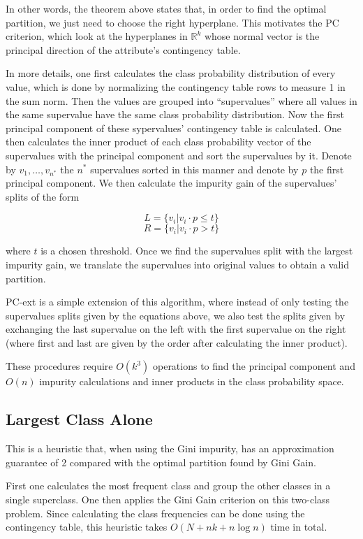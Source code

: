 In other words, the theorem above states that, in order to find the optimal partition, we just need to choose the right hyperplane. This motivates the PC criterion, which look at the hyperplanes in $\mathbb{R}^k$ whose normal vector is the principal direction of the attribute's contingency table.

In more details, one first calculates the class probability distribution of every value, which is done by normalizing the contingency table rows to measure 1 in the sum norm. Then the values are grouped into ``supervalues'' where all values in the same supervalue have the same class probability distribution. Now the first principal component of these sypervalues' contingency table is calculated. One then calculates the inner product of each class probability vector of the supervalues  with the principal component and sort the supervalues by it. Denote by $v_1,\ldots,v_{n^*}$ the $n^*$ supervalues sorted in this manner and denote by $p$ the first principal component. We then calculate the impurity gain of the supervalues' splits of the form

$$L = \{v_i | v_i \cdot p \leq t\}$$
$$R = \{v_i | v_i \cdot p > t\}$$

where $t$ is a chosen threshold. Once we find the supervalues split with the largest impurity gain, we translate the supervalues into original values to obtain a valid partition.

PC-ext is a simple extension of this algorithm, where instead of only testing the supervalues splits given by the equations above, we also test the splits given by  exchanging the last supervalue on the left with the first supervalue on the right (where first and last are given by the order after calculating the inner product).

These procedures require $O(k^3)$ operations to find the principal component and $O(n)$ impurity calculations and inner products in the class probability space.

\subsection{Largest Class Alone}

This is a heuristic that, when using the Gini impurity, has an approximation guarantee of 2 compared with the optimal partition found by Gini Gain.

First one calculates the most frequent class and group the other classes in a single superclass. One then applies the Gini Gain criterion on this two-class problem. Since calculating the class frequencies can be done using the contingency table, this heuristic takes $O(N + n k + n \log n)$ time in total.

